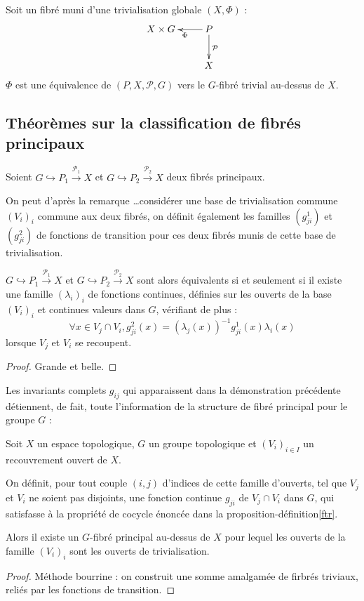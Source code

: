 \begin{exem}
Soit \Fig un fibr\'e muni d'une trivialisation globale $(X,\Phi)$ :
\[\xymatrix{X \times G & P \ar[l]^{\Phi} \ar[d]^{\mathcal{P}}\\ & X}\]
$\Phi$ est une \'equivalence de $(P,X,\mathcal{P},G)$ vers le $G$-fibr\'e trivial au-dessus de $X$.
\end{exem}

\subsection{Th\'eor\`emes sur la classification de fibr\'es principaux}

\begin{theo}%
Soient $G \hookrightarrow P_1 \xrightarrow{\mathcal{P}_1} X$ et $G \hookrightarrow P_2 \xrightarrow{\mathcal{P}_2} X$ deux fibrés principaux.
\par
On peut d'après la remarque \dots consid\'erer une base de trivialisation commune $(V_i)_i$ commune aux deux fibr\'es, %
on définit également les familles $(g^1_{ji})$ et $(g^2_{ji})$ de fonctions de transition pour ces deux fibrés munis de cette base de trivialisation.
\par
$G \hookrightarrow P_1 \xrightarrow{\mathcal{P}_1} X$ et $G \hookrightarrow P_2 \xrightarrow{\mathcal{P}_2} X$ sont alors \'equivalents si et seulement si %
il existe une famille $(\lambda_i)_i$ de fonctions continues, d\'efinies sur les ouverts de la base $(V_i)_i$ et continues  valeurs dans $G$, v\'erifiant de plus :
\[\forall x \in V_j \cap V_i , g^2_{ji}(x) = (\lambda_j(x))^{-1}g^1_{ji}(x)\lambda_i(x)\]
lorsque $V_j$ et $V_i$ se recoupent.
\end{theo}

\begin{proof}
Grande et belle.
\end{proof}

Les invariants complets $g_{ij}$ qui apparaissent dans la d\'emonstration pr\'ec\'edente d\'etiennent, de fait, toute l'information de la structure de fibré principal pour le groupe $G$ :

\begin{theo}
Soit $X$ un espace topologique, $G$ un groupe topologique et $(V_i)_{i \in I}$ un recouvrement ouvert de $X$.
\par
On d\'efinit, pour tout couple $(i,j)$ d'indices de cette famille d'ouverts, tel que $V_j$ et  $V_i$ ne soient pas disjoints, %
une fonction continue $g_{ji}$ de $V_j \cap V_i$ dans $G$, qui satisfasse à la propri\'et\'e de cocycle énoncée dans la proposition-définition\ref{ftr}.
\par
Alors il existe un $G$-fibré principal au-dessus de $X$ pour lequel les ouverts de la famille $(V_i)_i$ sont les ouverts de trivialisation.
\end{theo}

\begin{proof}
M\'ethode bourrine : on construit une somme amalgam\'ee de firbr\'es triviaux, reli\'es par les fonctions de transition.
\end{proof}
